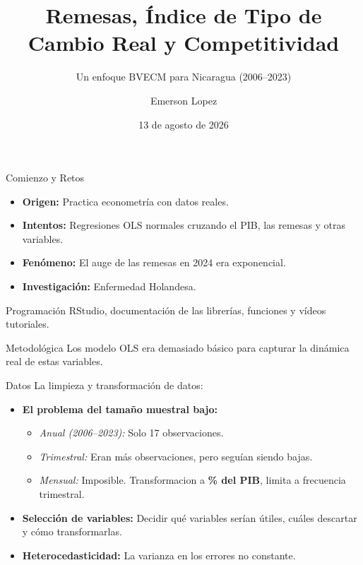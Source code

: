 \documentclass[
  10pt,
  ignorenonframetext,
  aspectratio=169,
  spanish,
]{beamer}
\title{\texorpdfstring{Remesas, Índice de Tipo de Cambio Real y
Competitividad}{Remesas{,} Índice de Tipo de Cambio Real y Competitividad}}
\subtitle{\texorpdfstring{Un enfoque BVECM para Nicaragua
(2006--2023)}{Un enfoque BVECM para Nicaragua (2006--2023)}}
\author{Emerson Lopez}
\date{13 de agosto de 2026}
\institute{Universidad Nacional de Ingeniería (UNI)}
\providecommand{\tightlist}{%
  \setlength{\itemsep}{0pt}\setlength{\parskip}{0pt}}
\begin{document}
\frame{\titlepage}


\begin{frame}{Comienzo y Retos}
\protect{}\label{comienzo-y-retos}
\begin{itemize}
\tightlist
\item
  \textbf{Origen:} Practica econometría con datos reales.
\item
  \textbf{Intentos:} Regresiones OLS normales cruzando el PIB, las
  remesas y otras variables.
\item
  \textbf{Fenómeno:} El auge de las remesas en 2024 era exponencial.
\item
  \textbf{Investigación:} Enfermedad Holandesa.
\end{itemize}

\begin{block}{Programación}
\protect{}\label{programaciuxf3n}
RStudio, documentación de las librerías, funciones y vídeos tutoriales.
\end{block}

\vspace{0.3cm}

\begin{block}{Metodológica}
\protect{}\label{metodoluxf3gica}
Los modelo OLS era demasiado básico para capturar la dinámica real de
estas variables.
\end{block}
\end{frame}

\begin{frame}{Datos}
\protect{}\label{datos}
La limpieza y transformación de datos:

\begin{itemize}
\tightlist
\item
  \textbf{El problema del tamaño muestral bajo:}

  \begin{itemize}
  \tightlist
  \item
    \emph{Anual (2006--2023):} Solo 17 observaciones.
  \item
    \emph{Trimestral:} Eran más observaciones, pero seguían siendo
    bajas.
  \item
    \emph{Mensual:} Imposible. Transformacion a \textbf{\% del PIB},
    limita a frecuencia trimestral.
  \end{itemize}
\item
  \textbf{Selección de variables:} Decidir qué variables serían útiles,
  cuáles descartar y cómo transformarlas.
\item
  \textbf{Heterocedasticidad:} La varianza en los errores no constante.
\end{itemize}
\end{frame}
\end{document}
